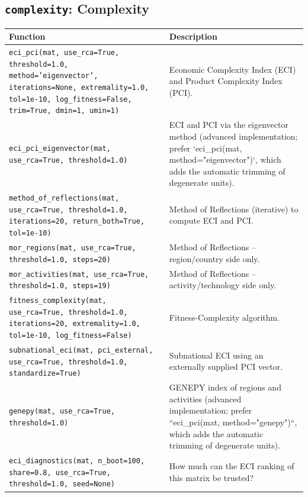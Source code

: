 \subsection{\texttt{complexity}: Complexity}
\begin{longtable}{>{\raggedright\arraybackslash}p{9.2cm} >{\raggedright\arraybackslash}p{7.0cm}}
\toprule
\textbf{Function} & \textbf{Description} \\
\midrule\endhead
\texttt{\footnotesize eci\_pci(mat, use\_rca=True, threshold=1.0, method='eigenvector', iterations=None, extremality=1.0, tol=1e-10, log\_fitness=False, trim=True, dmin=1, umin=1)} & {\small Economic Complexity Index (ECI) and Product Complexity Index (PCI).} \\[2pt]
\texttt{\footnotesize eci\_pci\_eigenvector(mat, use\_rca=True, threshold=1.0)} & {\small ECI and PCI via the eigenvector method (advanced implementation; prefer `eci\_pci(mat, method="eigenvector")`, which adds the automatic trimming of degenerate units).} \\[2pt]
\texttt{\footnotesize method\_of\_reflections(mat, use\_rca=True, threshold=1.0, iterations=20, return\_both=True, tol=1e-10)} & {\small Method of Reflections (iterative) to compute ECI and PCI.} \\[2pt]
\texttt{\footnotesize mor\_regions(mat, use\_rca=True, threshold=1.0, steps=20)} & {\small Method of Reflections -- region/country side only.} \\[2pt]
\texttt{\footnotesize mor\_activities(mat, use\_rca=True, threshold=1.0, steps=19)} & {\small Method of Reflections -- activity/technology side only.} \\[2pt]
\texttt{\footnotesize fitness\_complexity(mat, use\_rca=True, threshold=1.0, iterations=20, extremality=1.0, tol=1e-10, log\_fitness=False)} & {\small Fitness-Complexity algorithm.} \\[2pt]
\texttt{\footnotesize subnational\_eci(mat, pci\_external, use\_rca=True, threshold=1.0, standardize=True)} & {\small Subnational ECI using an externally supplied PCI vector.} \\[2pt]
\texttt{\footnotesize genepy(mat, use\_rca=True, threshold=1.0)} & {\small GENEPY index of regions and activities (advanced implementation; prefer ``eci\_pci(mat, method="genepy")``, which adds the automatic trimming of degenerate units).} \\[2pt]
\texttt{\footnotesize eci\_diagnostics(mat, n\_boot=100, share=0.8, use\_rca=True, threshold=1.0, seed=None)} & {\small How much can the ECI ranking of this matrix be trusted?} \\[2pt]
\bottomrule
\end{longtable}

